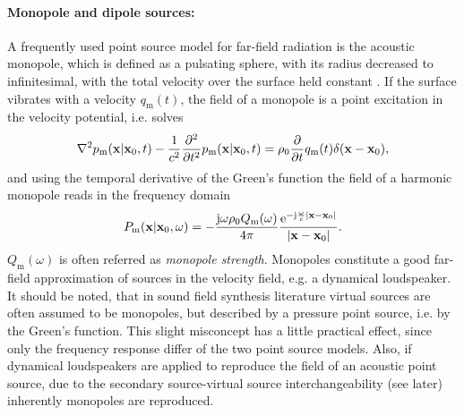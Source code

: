 \paragraph{Monopole and dipole sources:\\} 
A frequently used point source model for far-field radiation is the acoustic monopole, which is defined as a pulsating sphere, with its radius decreased to infinitesimal, with the total velocity over the surface held constant \cite{Howe2007}. If the surface vibrates with a velocity $q_{\mathrm{m}}(t)$, the field of a monopole is a point excitation in the velocity potential, i.e. solves
\begin{equation}
\nabla^2 p_{\mathrm{m}}(\mathbf{x}|\mathbf{x}_0,t) - 	\frac{1}{c^2}\frac{\partial^2}{\partial t^2}p_{\mathrm{m}}(\mathbf{x}|\mathbf{x}_0,t) = \rho_0 \frac{\partial}{\partial t} q_{\mathrm{m}}(t)\delta(\mathbf{x}-\mathbf{x}_0),
\end{equation}
and using the temporal derivative of the Green's function the field of a harmonic monopole reads in the frequency domain
\begin{equation}
P_{\mathrm{m}}(\mathbf{x}|\mathbf{x}_0,\omega) = -\frac{\mathrm{j} \omega \rho_0 Q_{\mathrm{m}}(\omega)}{4\pi}\frac{\mathrm{e}^{-\mathrm{j} \frac{\omega}{c}|\mathbf{x}-\mathbf{x}_0|}}{|\mathbf{x}-\mathbf{x}_0|}.
\end{equation}
$Q_{\mathrm{m}}(\omega)$ is often referred as \emph{monopole strength}. Monopoles constitute a good far-field approximation of sources in the velocity field, e.g. a dynamical loudspeaker. It should be noted, that in sound field synthesis literature virtual sources are often assumed to be monopoles, but described by a pressure point source, i.e.  by the Green's function. This slight misconcept has a little practical effect, since only the frequency response differ of the two point source models. Also, if dynamical loudspeakers are applied to reproduce the field of an acoustic point source, due to the secondary source-virtual source interchangeability (see later) inherently monopoles are reproduced.

